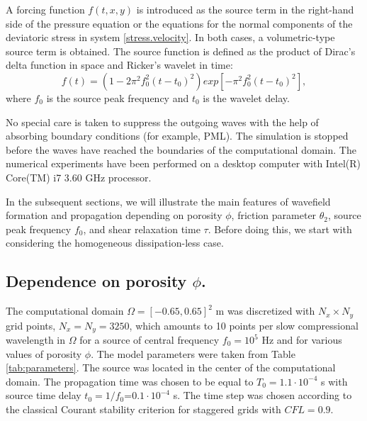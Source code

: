 \documentclass[3p,times,table]{article}
\begin{document}
A forcing function $f(t,x,y)$ is introduced as the source term in the 
right-hand side of the pressure equation or the equations for the normal components 
of 
the deviatoric stress in system \eqref{stress.velocity}. In both cases, a 
volumetric-type source term is obtained. The source function is 
defined as the product of Dirac's delta function in space and Ricker's wavelet in time: 
\begin{equation}
f(t)=(1-2\pi ^{2} f_{0}^{2}(t-t_{0})^{2})exp[-\pi ^{2}f_{0}^{2}(t-t_{0})^{2}],
\end{equation}
where $f_{0}$ is the source peak frequency and $t_{0}$ is the wavelet delay.

No special care is taken to suppress the  outgoing waves with the help of absorbing boundary conditions (for example, PML). The simulation is stopped before the waves have reached the boundaries of the computational domain. 
The numerical experiments have been performed on a desktop computer with Intel(R) 
Core(TM) i7 3.60 GHz processor.

In the subsequent sections, we  will illustrate the main features of  
wavefield formation and propagation depending on porosity $\phi$, 
friction parameter $\theta_2$, source peak frequency $f_{0}$, and  shear relaxation time $\tau$. Before doing 
this, we start with considering the homogeneous dissipation-less case.

\subsection{Dependence on  porosity $\phi$.}

The computational domain $\Omega =[-0.65, 0.65]^{2}$  m was discretized with 
$ N_x \times N_y$ grid points, $N_x = N_y = 3250$, which amounts to 10 points 
per 
slow 
compressional wavelength in $\Omega$ for a source of central frequency 
$f_0=10^{5} $ Hz  and for various values of porosity $\phi$. The model 
parameters were taken from Table\,\ref{tab:parameters}. The source was located 
in the center of the computational 
domain. The propagation time was chosen to be equal to $T_{0}= 1.1\cdot10^{-4}$ s  with 
 source time delay $t_{0}=1/f_{0}$=$ 0.1\cdot10^{-4}$ s. 
The time step was chosen according to 
the classical Courant stability criterion for staggered grids with $CFL = 0.9$. 
\end{document}
